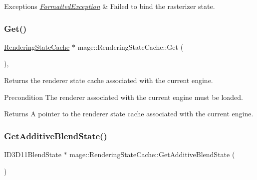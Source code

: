 \begin{DoxyExceptions}{Exceptions}
{\em \hyperlink{structmage_1_1_formatted_exception}{Formatted\+Exception}} & Failed to bind the rasterizer state. \\
\hline
\end{DoxyExceptions}
\hypertarget{structmage_1_1_rendering_state_cache_a1792e037c8847d1d35219305bce42c52}{}\label{structmage_1_1_rendering_state_cache_a1792e037c8847d1d35219305bce42c52} 
\subsubsection{\texorpdfstring{Get()}{Get()}}
{\footnotesize\ttfamily \hyperlink{structmage_1_1_rendering_state_cache}{Rendering\+State\+Cache} $\ast$ mage\+::\+Rendering\+State\+Cache\+::\+Get (\begin{DoxyParamCaption}{ }\end{DoxyParamCaption})\hspace{0.3cm}{\ttfamily [static]}, {\ttfamily [noexcept]}}

Returns the renderer state cache associated with the current engine.

\begin{DoxyPrecond}{Precondition}
The renderer associated with the current engine must be loaded. 
\end{DoxyPrecond}
\begin{DoxyReturn}{Returns}
A pointer to the renderer state cache associated with the current engine. 
\end{DoxyReturn}
\hypertarget{structmage_1_1_rendering_state_cache_afa897dcd0b71e4ff8e6ce6d8e31aaa71}{}\label{structmage_1_1_rendering_state_cache_afa897dcd0b71e4ff8e6ce6d8e31aaa71} 
\subsubsection{\texorpdfstring{Get\+Additive\+Blend\+State()}{GetAdditiveBlendState()}}
{\footnotesize\ttfamily I\+D3\+D11\+Blend\+State $\ast$ mage\+::\+Rendering\+State\+Cache\+::\+Get\+Additive\+Blend\+State (\begin{DoxyParamCaption}{ }\end{DoxyParamCaption})}

